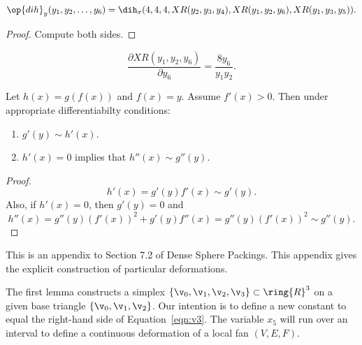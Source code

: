\begin{lemma}[]
\[
\op{dih}_y(y_1,y_2,\ldots,y_6) = \dih_x(4,4,4,XR(y_2,y_3,y_4),XR(y_1,y_2,y_6),XR(y_1,y_3,y_5)).
\]
\end{lemma}

\begin{proof}
Compute both sides.
\end{proof}

\begin{lemma}[]
\[
\frac{\partial XR(y_1,y_2,y_6)}{\partial y_6} = \frac{8 y_6}{y_1 y_2}.
\]
\end{lemma}

\begin{lemma}[]
Let $h(x) = g(f(x))$ and $f(x)= y$.  Assume $f'(x)>0$.  Then under appropriate differentiabilty conditions:
\begin{enumerate}
\item $g'(y) \sim h'(x)$.
\item $h'(x) = 0$ implies that $h''(x)\sim g''(y)$.
\end{enumerate}
\end{lemma}

\begin{proof}
\[
h'(x) = g'(y) f'(x) \sim g'(y).
\]
Also, if $h'(x) = 0$, then $g'(y)=0$ and
\[
h''(x) = g''(y) (f'(x))^2 + g'(y) f''(x) = g''(y) (f'(x))^2 \sim g''(y).
\]
\end{proof}


\newpage
{}\label{sec:ex-deformation}

This is an appendix to Section 7.2 of Dense Sphere Packings.
This appendix gives the explicit construction of particular deformations.

The first lemma constructs a simplex $\{\v_0,\v_1,\v_2,\v_3\}\subset\ring{R}^3$ on
a given base triangle $\{\v_0,\v_1,\v_2\}$.  Our intention is to define a new constant
to equal the right-hand side of Equation~\ref{eqn:v3}.  The variable $x_5$ will run over
an interval to define a continuous deformation of a local fan $(V,E,F)$.


